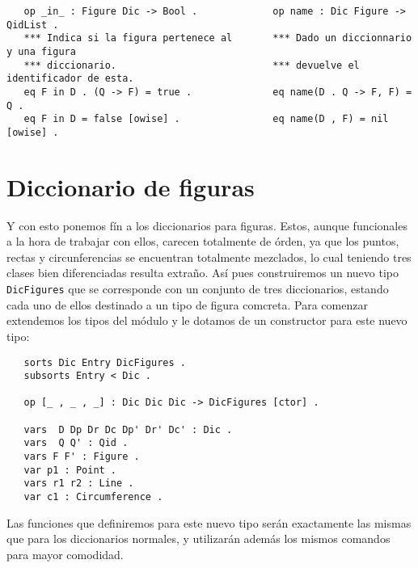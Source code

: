 {\codesize
\begin{verbatim}
   op _in_ : Figure Dic -> Bool .             op name : Dic Figure -> QidList .
   *** Indica si la figura pertenece al       *** Dado un diccionnario y una figura 
   *** diccionario.                           *** devuelve el identificador de esta.
   eq F in D . (Q -> F) = true .              eq name(D . Q -> F, F) = Q .
   eq F in D = false [owise] .                eq name(D , F) = nil [owise] . 
\end{verbatim}
}

\section{Diccionario de figuras}

Y con esto ponemos fín a los diccionarios para figuras. Estos, aunque funcionales a la hora de trabajar con ellos, carecen totalmente de órden, ya que los puntos, rectas y circunferencias se encuentran totalmente mezclados, lo cual teniendo tres clases bien diferenciadas resulta extraño. Así pues construiremos un nuevo tipo \texttt{DicFigures} que se corresponde con un conjunto de tres diccionarios, estando cada uno de ellos destinado a un tipo de figura comcreta. Para comenzar extendemos los tipos del módulo y le dotamos de un constructor para este nuevo tipo: \par

{\codesize
\begin{verbatim}
   sorts Dic Entry DicFigures .
   subsorts Entry < Dic .

   op [_ , _ , _] : Dic Dic Dic -> DicFigures [ctor] .

   vars  D Dp Dr Dc Dp' Dr' Dc' : Dic .
   vars  Q Q' : Qid .
   vars F F' : Figure .
   var p1 : Point .
   vars r1 r2 : Line .
   var c1 : Circumference .
\end{verbatim}
}

Las funciones que definiremos para este nuevo tipo serán exactamente las mismas que para los diccionarios normales, y utilizarán además los mismos comandos para mayor comodidad. \par

